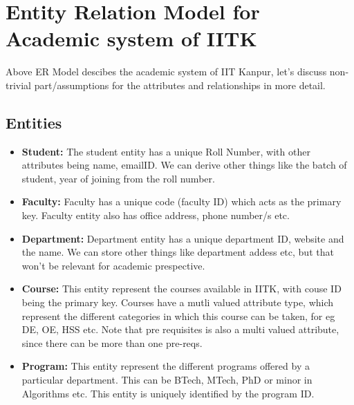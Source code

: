 \documentclass[a4paper]{article}
\begin{document}


\section*{Entity Relation Model for Academic system of IITK}
Above ER Model descibes the academic system of IIT Kanpur, let's discuss non-trivial part/assumptions for the attributes and relationships in more detail.

\subsection*{Entities}
\begin{itemize}
	\item{\textbf{Student:}} The student entity has a unique Roll Number, with other attributes being name, emailID.
	We can derive other things like the batch of student, year of joining from the roll number.
	\item{\textbf{Faculty:}} Faculty has a unique code (faculty ID) which acts as the primary key.
	Faculty entity also has office address, phone number/s etc.
	\item{\textbf{Department:}} Department entity has a unique department ID, website and the name.
	We can store other things like department addess etc, but that won't be relevant for academic prespective.
	\item{\textbf{Course:}} This entity represent the courses available in IITK, with couse ID being the primary key.
	Courses have a mutli valued attribute type, which represent the different categories in which
	this course can be taken, for eg DE, OE, HSS etc. Note that pre requisites is also a multi valued attribute,
	since there can be more  than one pre-reqs.
	\item{\textbf{Program:}} This entity represent the different programs offered by a particular department.
	This can be BTech, MTech, PhD or minor in Algorithms etc. This entity is uniquely identified by the program ID.
\end{itemize}
\end{document}
